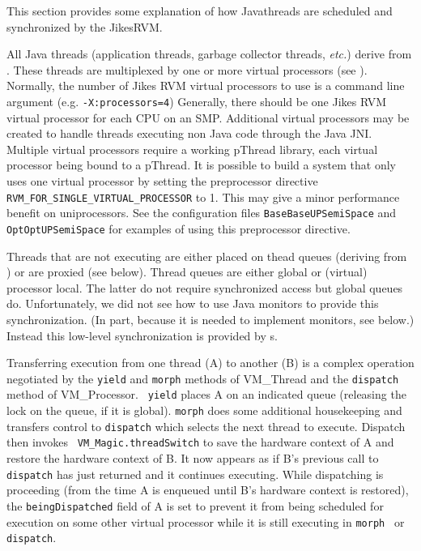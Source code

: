 This section provides some explanation of how Java\trademark threads are
scheduled and synchronized by the Jikes\trademark RVM.


All Java threads (application threads, garbage collector threads, {\em
etc.})  derive from 
.  
These threads are multiplexed by
one or more virtual processors (see 
).  Normally, the
number of Jikes RVM virtual processors to use is a command line argument
(e.g. {\tt -X:processors=4}) Generally, there should be one Jikes RVM
virtual processor for each CPU on an SMP.  Additional virtual
processors may be created to handle threads executing non Java code
through the Java JNI.  Multiple virtual processors require a working
pThread library, each virtual processor being bound to a pThread.  It
is possible to build a system that only uses one virtual processor by
setting the preprocessor directive {\tt
RVM\_FOR\_SINGLE\_VIRTUAL\_PROCESSOR} to 1.  This may give a minor
performance benefit on uniprocessors. See the configuration files
{\tt BaseBaseUPSemiSpace} and {\tt OptOptUPSemiSpace} for examples of
using this preprocessor directive.

Threads that are not executing are either placed on thead queues
(deriving from 
) or are proxied (see below).
Thread queues are either global or (virtual) processor local.  The
latter do not require synchronized access but global queues do.
Unfortunately, we did not see how to use Java monitors to provide
this synchronization.  (In part, because it is needed to implement
monitors, see below.)  Instead this low-level synchronization is
provided by 
s.

Transferring execution from one thread (A) to another (B) is a complex
operation negotiated by the {\tt yield} and {\tt morph} methods of
VM\_Thread and the {\tt dispatch} method of VM\_Processor.  {\tt
yield} places A on an indicated queue (releasing the lock on the
queue, if it is global).  {\tt morph} does some additional
housekeeping and transfers control to {\tt dispatch} which selects the
next thread to execute. Dispatch then invokes {\tt
VM\_Magic.threadSwitch} to save the hardware context of A and restore
the hardware context of B.  It now appears as if B's previous call to
{\tt dispatch} has just returned and it continues executing. While
dispatching is proceeding (from the time A is enqueued until B's
hardware context is restored), the {\tt beingDispatched} field of A is
set to prevent it from being scheduled for execution on some other
virtual processor while it is still executing in {\tt morph } or {\tt
dispatch}. 

